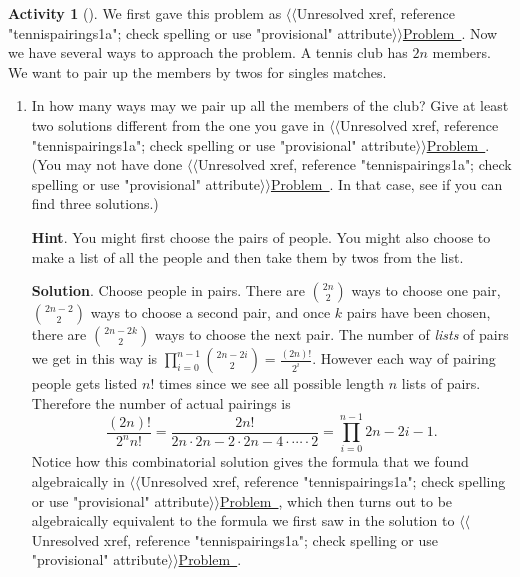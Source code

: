\documentclass[10pt,]{book}
\theoremstyle{plain}
\theoremstyle{definition}
\theoremstyle{definition}
\theoremstyle{definition}
\newtheorem{activity}[project]{Activity}
\theoremstyle{definition}
\numberwithin{equation}{chapter}
\begin{document}
\begin{activity}[]\label{tennispairings2}
\hypertarget{p-676}{}%
We first gave this problem as {$\langle\langle$Unresolved xref, reference "tennispairings1a"; check spelling or use "provisional" attribute$\rangle\rangle$}\hyperlink{}{Problem~}. Now we have several ways to approach the problem. A tennis club has \(2n\) members. We want to pair up the members by twos for singles matches.%
\begin{enumerate}[font=\bfseries,label=(\alph*),ref=\alph*]
\item\label{task-76} \hypertarget{p-677}{}%
In how many ways may we pair up all the members of the club? Give at least two solutions different from the one you gave in   {$\langle\langle$Unresolved xref, reference "tennispairings1a"; check spelling or use "provisional" attribute$\rangle\rangle$}\hyperlink{}{Problem~}. (You may not have done {$\langle\langle$Unresolved xref, reference "tennispairings1a"; check spelling or use "provisional" attribute$\rangle\rangle$}\hyperlink{}{Problem~}. In that case, see if you can find three solutions.)%
\par\smallskip%
\noindent\textbf{Hint}.\hypertarget{hint-44}{}\quad%
\hypertarget{p-678}{}%
You might first choose the pairs of people. You might also choose to make a list of all the people and then take them by twos from the list.%
\par\smallskip%
\noindent\textbf{Solution}.\hypertarget{solution-61}{}\quad%
\hypertarget{p-679}{}%
Choose people in pairs. There are \(\binom{2n}{2}\) ways to choose one pair, \(\binom{2n-2}{2}\) ways to choose a second pair, and once \(k\) pairs have been chosen, there are \(\binom{2n-2k}{2}\) ways to choose the next pair. The number of \emph{lists} of pairs we get in this way is \(\prod_{i=0}^{n-1} \binom{2n-2i}{2}= \frac{(2n)!}{2^i}\). However each way of pairing people gets listed \(n!\) times since we see all possible length \(n\) lists of pairs. Therefore the number of actual pairings is%
\begin{equation*}
\frac{(2n)!}{2^n n!} = \frac{2n!}{2n\cdot2n-2\cdot2n-4\cdot \cdots\cdot 2} =  \prod_{i=0}^{n-1} 2n-2i-1.
\end{equation*}
Notice how this combinatorial solution gives the formula that we found algebraically in {$\langle\langle$Unresolved xref, reference "tennispairings1a"; check spelling or use "provisional" attribute$\rangle\rangle$}\hyperlink{}{Problem~}, which then turns out to be algebraically equivalent to the formula we first saw in the solution to {$\langle\langle$Unresolved xref, reference "tennispairings1a"; check spelling or use "provisional" attribute$\rangle\rangle$}\hyperlink{}{Problem~}.%

\end{enumerate}
\end{activity}
\end{document}
